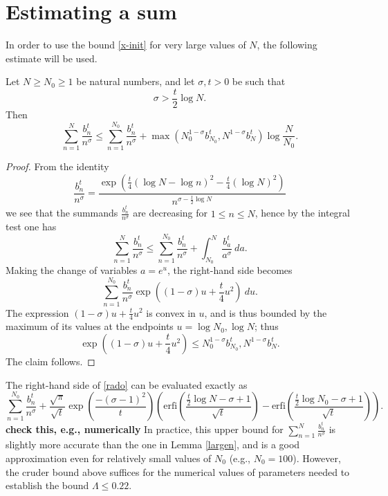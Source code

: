 \section{Estimating a sum}

In order to use the bound \eqref{x-init} for very large values of $N$, the following estimate will be used.

\begin{lemma}\label{largen}
Let $N \geq N_0 \geq 1$ be natural numbers, and let $\sigma,t > 0$ be such that
$$ \sigma > \frac{t}{2} \log N.$$
Then
$$ \sum_{n=1}^N \frac{b_n^t}{n^\sigma} \leq \sum_{n=1}^{N_0}
\frac{b_n^t}{n^\sigma}  + 
\max( N_0^{1-\sigma} b_{N_0}^t, N^{1-\sigma} b_N^t ) \log \frac{N}{N_0}.$$
\end{lemma}

\begin{proof}  From the identity
$$ \frac{b_n^t}{n^\sigma} = \frac{\exp\left( \frac{t}{4} (\log N - \log n)^2 - \frac{t}{4} (\log N)^2\right) }{n^{\sigma - \frac{t}{2} \log N}}$$
we see that the summands $\frac{b_n^t}{n^\sigma}$ are decreasing for $1 \leq n \leq N$, hence by the integral test one has
\begin{equation}\label{rado}
 \sum_{n=1}^N \frac{b_n^t}{n^\sigma} \leq \sum_{n=1}^{N_0}
\frac{b_n^t}{n^\sigma}  + \int_{N_0}^N \frac{b_a^t}{a^\sigma}\ da.
\end{equation}
Making the change of variables $a = e^u$, the right-hand side becomes
$$\sum_{n=1}^{N_0} \frac{b_n^t}{n^\sigma} \exp( (1-\sigma) u + \frac{t}{4} u^2 )\ du.$$
The expression $(1-\sigma) u + \frac{t}{4} u^2$ is convex in $u$, and is thus bounded by the maximum of its values at the endpoints $u = \log N_0, \log N$; thus
$$\exp( (1-\sigma) u + \frac{t}{4} u^2) \leq N_0^{1-\sigma} b_{N_0}^t, N^{1-\sigma} b_N^t.$$
The claim follows. 
\end{proof}

\begin{remark}  The right-hand side of \eqref{rado} can be evaluated exactly as
$$
\sum_{n=1}^{N_0}
\frac{b_n^t}{n^\sigma}  + \frac{\sqrt \pi}{\sqrt t} \exp(\frac{-(\sigma - 1)^2}{t}) \left( \textrm{erfi}(\frac{\frac{t}{2} \log N  - \sigma + 1}{\sqrt t} ) - \textrm{erfi}(\frac{\frac{t}{2} \log N_0  - \sigma + 1}{\sqrt t}) \right).$$
{\bf check this, e.g., numerically}
In practice, this upper bound for $\sum_{n=1}^N \frac{b_n^t}{n^\sigma}$ is slightly more accurate than the one in Lemma \ref{largen}, and is a good approximation even for relatively small values of $N_0$ (e.g., $N_0=100$).  However, the cruder bound above suffices for the numerical values of parameters needed to establish the bound $\Lambda \leq 0.22$.
\end{remark}


